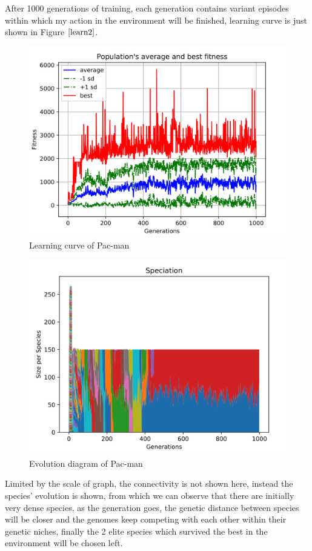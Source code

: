\documentclass{article}
\begin{document}
After 1000 generations of training, each generation contains variant episodes within which my action in the environment will be finished,
learning curve is just shown in Figure $\ref{learn2}$.

\begin{figure}[htbp]
  \centering
  \includegraphics[width = .7\textwidth]{fitness_atari}
  \caption{Learning curve of Pac-man}
  \label{learn2}
 \end{figure}

 \begin{figure}[htbp]
  \centering
  \includegraphics[width = .7\textwidth]{speciation_atari}
  \caption{Evolution diagram of Pac-man}
  \label{evo2}
 \end{figure}
 Limited by the scale of graph, the connectivity is not shown here, instead the species' evolution
 is shown, from which we can observe that there are initially very dense species, as the generation goes,
 the genetic distance between species will be closer and the genomes keep competing with each other within their
 genetic niches, finally the 2 elite species which survived the best in the environment will be chosen left.

 
\end{document}
